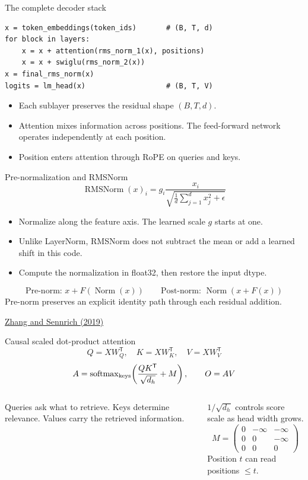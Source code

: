 \documentclass[11pt,aspectratio=169]{beamer}
\newcommand{\paper}[2]{\par{\scriptsize\color{muted}\href{#2}{#1}\par}}
\begin{document}
\begin{frame}[fragile]{The complete decoder stack}
\begin{lstlisting}
x = token_embeddings(token_ids)       # (B, T, d)
for block in layers:
    x = x + attention(rms_norm_1(x), positions)
    x = x + swiglu(rms_norm_2(x))
x = final_rms_norm(x)
logits = lm_head(x)                   # (B, T, V)
\end{lstlisting}
\begin{itemize}
\item Each sublayer preserves the residual shape $(B,T,d)$.
\item Attention mixes information across positions. The feed-forward network operates independently at each position.
\item Position enters attention through RoPE on queries and keys.
\end{itemize}
\end{frame}

\begin{frame}{Pre-normalization and RMSNorm}
\[
\operatorname{RMSNorm}(x)_i
=g_i\frac{x_i}{\sqrt{\frac1d\sum_{j=1}^d x_j^2+\epsilon}}
\]
\begin{itemize}
\item Normalize along the feature axis. The learned scale $g$ starts at one.
\item Unlike LayerNorm, RMSNorm does not subtract the mean or add a learned shift in this code.
\item Compute the normalization in float32, then restore the input dtype.
\end{itemize}
\[
\text{Pre-norm: }x+F(\operatorname{Norm}(x))
\qquad\text{Post-norm: }\operatorname{Norm}(x+F(x))
\]
Pre-norm preserves an explicit identity path through each residual addition.
\paper{Zhang and Sennrich (2019)}{https://arxiv.org/abs/1910.07467}
\end{frame}

\begin{frame}{Causal scaled dot-product attention}
\[
Q=XW_Q^{\mathsf T},\quad K=XW_K^{\mathsf T},\quad V=XW_V^{\mathsf T}
\]
\[
A=\operatorname{softmax}_{\rm keys}\!\left(\frac{QK^{\mathsf T}}{\sqrt{d_h}}+M\right),
\qquad O=AV
\]
\begin{columns}[T]
Queries ask what to retrieve. Keys determine relevance. Values carry the retrieved information.\par
$1/\sqrt{d_h}$ controls score scale as head width grows.
\[
M=\begin{pmatrix}
0&-\infty&-\infty\\
0&0&-\infty\\
0&0&0
\end{pmatrix}
\]
Position $t$ can read positions $\leq t$.
\end{columns}
\end{frame}
\end{document}
